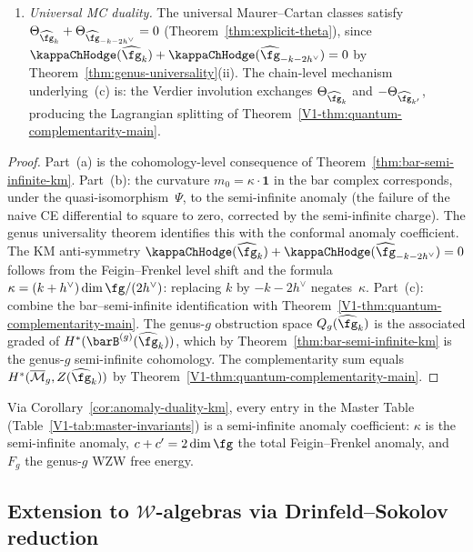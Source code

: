 \begin{corollary}
\begin{enumerate}[label=\textup{(\alph*)}]
\item \emph{Universal MC duality.}
The universal Maurer--Cartan classes satisfy
$\Theta_{\widehat{\fg}_k} + \Theta_{\widehat{\fg}_{-k-2h^\vee}}
= 0$ (Theorem~\ref{thm:explicit-theta}), since
$\kappaChHodge(\widehat{\fg}_k) + \kappaChHodge(\widehat{\fg}_{-k-2h^\vee}) = 0$
by Theorem~\ref{thm:genus-universality}(ii).
The chain-level mechanism underlying~(c) is:
the Verdier involution exchanges
$\Theta_{\widehat{\fg}_k}$ and $-\Theta_{\widehat{\fg}_{k'}}$,
producing the Lagrangian splitting of
Theorem~\ref{V1-thm:quantum-complementarity-main}.
\end{enumerate}
\end{corollary}

\begin{proof}
Part~(a) is the cohomology-level consequence of
Theorem~\ref{thm:bar-semi-infinite-km}. Part~(b): the
curvature $m_0 = \kappa \cdot \mathbf{1}$ in the bar complex
corresponds, under the quasi-isomorphism~$\Psi$, to the
semi-infinite anomaly (the failure of the naive CE differential
to square to zero, corrected by the semi-infinite charge).
The genus universality theorem identifies this with the
conformal anomaly coefficient. The KM anti-symmetry
$\kappaChHodge(\widehat{\fg}_k) + \kappaChHodge(\widehat{\fg}_{-k-2h^\vee}) = 0$
follows from the Feigin--Frenkel level shift and the formula
$\kappa = (k+h^\vee)\dim\fg/(2h^\vee)$: replacing $k$ by
$-k - 2h^\vee$ negates~$\kappa$.
Part~(c): combine the bar--semi-infinite identification with
Theorem~\ref{V1-thm:quantum-complementarity-main}. The genus-$g$
obstruction space $Q_g(\widehat{\fg}_k)$ is the associated
graded of $H^*(\barB^{(g)}(\widehat{\fg}_k))$, which by
Theorem~\ref{thm:bar-semi-infinite-km} is the genus-$g$
semi-infinite cohomology. The complementarity sum equals
$H^*(\overline{\mathcal{M}}_g, Z(\widehat{\fg}_k))$ by
Theorem~\ref{V1-thm:quantum-complementarity-main}.
\end{proof}

\begin{remark}
\label{rem:master-table-brst}
Via Corollary~\ref{cor:anomaly-duality-km}, every entry in the Master Table (Table~\ref{V1-tab:master-invariants}) is a semi-infinite anomaly coefficient: $\kappa$ is the semi-infinite anomaly, $c + c' = 2\dim\fg$ the total Feigin--Frenkel anomaly, and $F_g$ the genus-$g$ WZW free energy.
\end{remark}

\subsection{Extension to $\mathcal{W}$-algebras via Drinfeld--Sokolov reduction}

